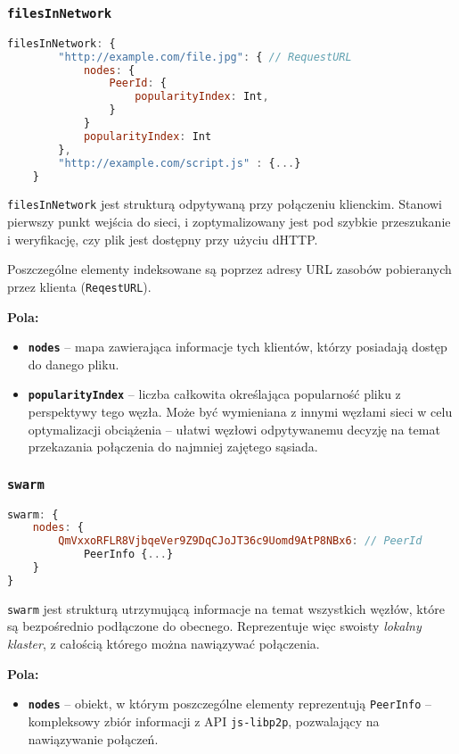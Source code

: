 % 

\subsubsection{\texttt{filesInNetwork}}
\begin{lstlisting}[language=javascript]
filesInNetwork: {
        "http://example.com/file.jpg": { // RequestURL
            nodes: {
                PeerId: {
                    popularityIndex: Int,
                }
            }
            popularityIndex: Int
        },
        "http://example.com/script.js" : {...}
    }
\end{lstlisting}
\texttt{filesInNetwork} jest strukturą odpytywaną przy połączeniu klienckim. Stanowi pierwszy punkt wejścia do sieci, i zoptymalizowany jest pod szybkie przeszukanie i weryfikację, czy plik jest dostępny przy użyciu dHTTP.

Poszczególne elementy indeksowane są poprzez adresy URL zasobów pobieranych przez klienta (\texttt{ReqestURL}).

\textbf{Pola:}
\begin{itemize}
    \item \textbf{\texttt{nodes}} -- mapa zawierająca informacje tych klientów, którzy posiadają dostęp do danego pliku.
    \item \textbf{\texttt{popularityIndex}} -- liczba całkowita określająca popularność pliku z perspektywy tego węzła. Może być wymieniana z innymi węzłami sieci w celu optymalizacji obciążenia -- ułatwi węzłowi odpytywanemu decyzję na temat przekazania połączenia do najmniej zajętego sąsiada.
\end{itemize}

% 

\subsubsection{\texttt{swarm}}
\begin{lstlisting}[language=javascript]
swarm: { 
    nodes: { 
        QmVxxoRFLR8VjbqeVer9Z9DqCJoJT36c9Uomd9AtP8NBx6: // PeerId
            PeerInfo {...}
    } 
}
\end{lstlisting}
\texttt{swarm} jest strukturą utrzymującą informacje na temat wszystkich węzłów, które są bezpośrednio podłączone do obecnego. Reprezentuje więc swoisty {\em lokalny klaster}, z całością którego można nawiązywać połączenia.

\textbf{Pola:}
\begin{itemize}
    \item \textbf{\texttt{nodes}} -- obiekt, w którym poszczególne elementy reprezentują \texttt{PeerInfo} -- kompleksowy zbiór informacji z API \texttt{js-libp2p}, pozwalający na nawiązywanie połączeń.
\end{itemize}

